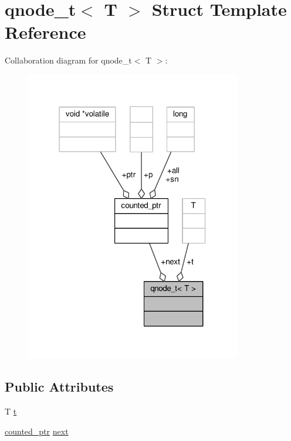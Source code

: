 \hypertarget{structqnode__t}{\section{qnode\-\_\-t$<$ T $>$ Struct Template Reference}
\label{structqnode__t}
}


Collaboration diagram for qnode\-\_\-t$<$ T $>$\-:
\nopagebreak
\begin{figure}[H]
\begin{center}
\leavevmode
\includegraphics[width=267pt]{structqnode__t__coll__graph}
\end{center}
\end{figure}
\subsection*{Public Attributes}
\begin{DoxyCompactItemize}
\item 
T \hyperlink{structqnode__t_af5debc0e6634705fb1617f9d8e324fc1}{t}
\item 
\hyperlink{unioncounted__ptr}{counted\-\_\-ptr} \hyperlink{structqnode__t_a2f0dc7e582ce26c4df540194817acfaf}{next}
\end{DoxyCompactItemize}


